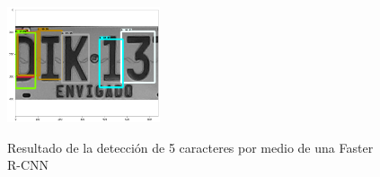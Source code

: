 \begin{figure}[h]
\centering
  {\includegraphics[width=0.4\textwidth]{imagenes/caracteres detectados/nuevo entrenamiento/5.png}}
    \caption{Resultado de la detección de 5 caracteres por medio de una Faster R-CNN }
    \label{fig:5caracteres}  
\end{figure}

